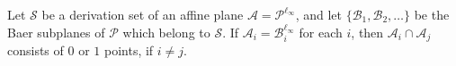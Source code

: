 Let $\mathcal{S}$ be a derivation set of an affine plane $\mathcal{A} = \mathcal{P}^{\ell_{\infty}}$, and let $\{\mathcal{B}_1, \mathcal{B}_2, \ldots\}$ be the Baer subplanes of $\mathcal{P}$ which belong to $\mathcal{S}$. If $\mathcal{A}_i = \mathcal{B}_i^{\ell_{\infty}}$ for each $i$, then $\mathcal{A}_i \cap \mathcal{A}_j$ consists of $0$ or $1$ points, if $i \neq j$.
